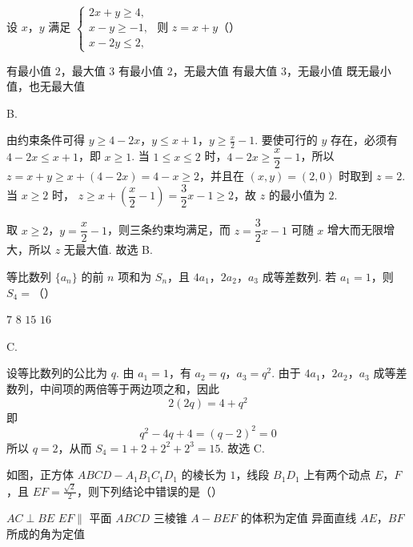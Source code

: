 \begin{problem}
设 \(x\)，\(y\) 满足 \(\begin{cases}
2x + y \geqslant 4,\\
x - y \geqslant -1,\\
x - 2y \leqslant 2,
\end{cases}\) 则 \(z = x + y\)（\quad）

\choices
    {有最小值 \(2\)，最大值 \(3\)}
    {有最小值 \(2\)，无最大值}
    {有最大值 \(3\)，无最小值}
    {既无最小值，也无最大值}
\end{problem}

\begin{answer}
B.
\end{answer}

\begin{solution}
由约束条件可得
\(y\geqslant4-2x\)，\(y\leqslant x+1\)，\(y\geqslant\frac{x}{2}-1\).
要使可行的 \(y\) 存在，必须有 \(4-2x\leqslant x+1\)，即 \(x\geqslant1\). 当 \(1\leqslant x\leqslant2\) 时，\(4-2x\geqslant\dfrac{x}{2}-1\)，所以
\(z=x+y\geqslant x+(4-2x)=4-x\geqslant2\)，并且在 \((x,y)=(2,0)\) 时取到 \(z=2\). 当 \(x\geqslant2\) 时，
\(z\geqslant x+\left(\dfrac{x}{2}-1\right)=\dfrac32x-1\geqslant2\)，故 \(z\) 的最小值为 \(2\).

取 \(x\geqslant2\)，\(y=\dfrac{x}{2}-1\)，则三条约束均满足，而
\(z=\dfrac32x-1\) 可随 \(x\) 增大而无限增大，所以 \(z\) 无最大值.
故选 B.
\end{solution}

\begin{problem}
等比数列 \(\{a_{n}\}\) 的前 \(n\) 项和为 \(S_{n}\)，且 \(4a_{1}\)，\(2a_{2}\)，\(a_{3}\) 成等差数列. 若 \(a_{1} = 1\)，则 \(S_{4} =\)（\quad）

\choices
    {\(7\)}
    {\(8\)}
    {\(15\)}
    {\(16\)}
\end{problem}

\begin{answer}
C.
\end{answer}

\begin{solution}
设等比数列的公比为 \(q\). 由 \(a_1=1\)，有
\(a_2=q\)，\(a_3=q^2\). 由于 \(4a_1\)，\(2a_2\)，\(a_3\) 成等差数列，中间项的两倍等于两边项之和，因此
\[
2(2q)=4+q^2
\]
即
\[
q^2-4q+4=(q-2)^2=0
\]
所以 \(q=2\)，从而
\(S_4=1+2+2^2+2^3=15\).
故选 C.
\end{solution}

\begin{problem}
如图，正方体 \(ABCD - A_{1}B_{1}C_{1}D_{1}\) 的棱长为 \(1\)，线段 \(B_{1}D_{1}\) 上有两个动点 \(E\)，\(F\)，且 \(EF = \frac{\sqrt{2}}{2}\)，则下列结论中错误的是（\quad）


\choices
    {\(AC \perp BE\)}
    {\(EF \parallel\) 平面 \(ABCD\)}
    {三棱锥 \(A - BEF\) 的体积为定值}
    {异面直线 \(AE\)，\(BF\) 所成的角为定值}
\end{problem}

